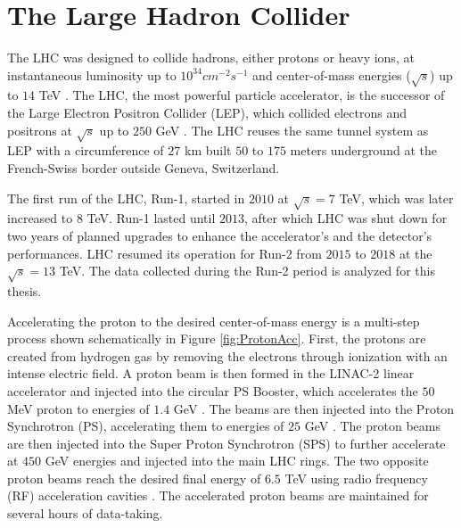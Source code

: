 \section{The Large Hadron Collider}
\label{sec:LHC}

The LHC was designed to collide hadrons, either protons or heavy ions, at instantaneous luminosity up to $10^{34}cm^{-2}s^{-1}$ and center-of-mass energies ($\sqrt{s}$) up to $14$ TeV \cite{LHCMachine}. The LHC, the most powerful particle accelerator, is the successor of the Large Electron Positron Collider (LEP), which collided electrons and positrons at $\sqrt{s}$ up to $250$ GeV \cite{LEP}. The LHC reuses the same tunnel system as LEP with a circumference of $27$ km built $50$ to $175$ meters underground at the French-Swiss border outside Geneva, Switzerland. 

The first run of the LHC, Run-1, started in $2010$ at $\sqrt{s} = 7$ TeV, which was later increased to $8$ TeV. Run-1 lasted until $2013$, after which LHC was shut down for two years of planned upgrades to enhance the accelerator's and the detector's performances. LHC resumed its operation for Run-2 from $2015$ to $2018$ at the $\sqrt{s} = 13$ TeV. The data collected during the Run-2 period is analyzed for this thesis. 

Accelerating the proton to the desired center-of-mass energy is a multi-step process shown schematically in Figure \ref{fig:ProtonAcc}. First, the protons are created from hydrogen gas by removing the electrons through ionization with an intense electric field. A proton beam is then formed in the LINAC-2 linear accelerator and injected into the circular PS Booster, which accelerates the $50$ MeV proton to energies of $1.4$ GeV \cite{LHCGuide}. The beams are then injected into the Proton Synchrotron (PS), accelerating them to energies of $25$ GeV \cite{LHCGuide}. The proton beams are then injected into the Super Proton Synchrotron (SPS) to further accelerate at $450$ GeV energies and injected into the main LHC rings. The two opposite proton beams reach the desired final energy of $6.5$ TeV using radio frequency (RF) acceleration cavities \cite{LHCGuide}. The accelerated proton beams are maintained for several hours of data-taking.


